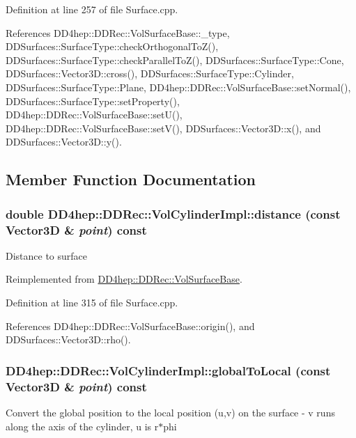 Definition at line 257 of file Surface.cpp.

References DD4hep::DDRec::VolSurfaceBase::\_\-type, DDSurfaces::SurfaceType::checkOrthogonalToZ(), DDSurfaces::SurfaceType::checkParallelToZ(), DDSurfaces::SurfaceType::Cone, DDSurfaces::Vector3D::cross(), DDSurfaces::SurfaceType::Cylinder, DDSurfaces::SurfaceType::Plane, DD4hep::DDRec::VolSurfaceBase::setNormal(), DDSurfaces::SurfaceType::setProperty(), DD4hep::DDRec::VolSurfaceBase::setU(), DD4hep::DDRec::VolSurfaceBase::setV(), DDSurfaces::Vector3D::x(), and DDSurfaces::Vector3D::y().

\subsection{Member Function Documentation}
\hypertarget{class_d_d4hep_1_1_d_d_rec_1_1_vol_cylinder_impl_adb7ecbd032387e6e2a2903251e66e490}{
\subsubsection[{distance}]{\setlength{\rightskip}{0pt plus 5cm}double DD4hep::DDRec::VolCylinderImpl::distance (const {\bf Vector3D} \& {\em point}) const}}
\label{class_d_d4hep_1_1_d_d_rec_1_1_vol_cylinder_impl_adb7ecbd032387e6e2a2903251e66e490}
Distance to surface 

Reimplemented from \hyperlink{class_d_d4hep_1_1_d_d_rec_1_1_vol_surface_base_afb85bf6e8e6b87fb52e67e26609b1048}{DD4hep::DDRec::VolSurfaceBase}.

Definition at line 315 of file Surface.cpp.

References DD4hep::DDRec::VolSurfaceBase::origin(), and DDSurfaces::Vector3D::rho().\hypertarget{class_d_d4hep_1_1_d_d_rec_1_1_vol_cylinder_impl_a66cd91cef2963fa1d1495d4764e2d94f}{
\subsubsection[{globalToLocal}]{ DD4hep::DDRec::VolCylinderImpl::globalToLocal (const {\bf Vector3D} \& {\em point}) const}}
\label{class_d_d4hep_1_1_d_d_rec_1_1_vol_cylinder_impl_a66cd91cef2963fa1d1495d4764e2d94f}
Convert the global position to the local position (u,v) on the surface -\/ v runs along the axis of the cylinder, u is r$\ast$phi 

